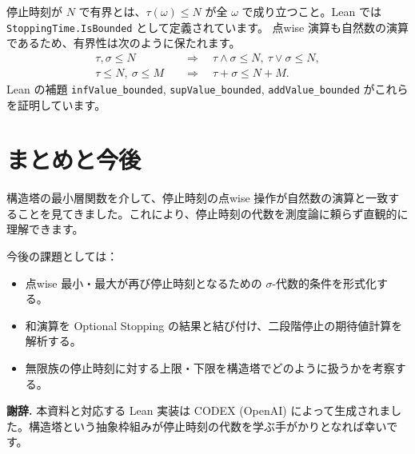 \documentclass[12pt]{ltjsarticle}
\theoremstyle{definition}
\theoremstyle{plain}
\begin{document}
停止時刻が $N$ で有界とは、$\tau(\omega)\le N$ が全 $\omega$ で成り立つこと。Lean では \texttt{StoppingTime.IsBounded} として定義されています。
点wise 演算も自然数の演算であるため、有界性は次のように保たれます。
\begin{align*}
  \tau,\sigma \le N \quad &\Longrightarrow\quad \tau\wedge\sigma \le N,\ \tau\vee\sigma \le N,\\
  \tau\le N,\ \sigma\le M \quad &\Longrightarrow\quad \tau+\sigma \le N+M.
\end{align*}
Lean の補題 \texttt{infValue\_bounded}, \texttt{supValue\_bounded}, \texttt{addValue\_bounded} がこれらを証明しています。

\section{まとめと今後}

構造塔の最小層関数を介して、停止時刻の点wise 操作が自然数の演算と一致することを見てきました。これにより、停止時刻の代数を測度論に頼らず直観的に理解できます。

今後の課題としては：
\begin{itemize}
  \item 点wise 最小・最大が再び停止時刻となるための $\sigma$-代数的条件を形式化する。
  \item 和演算を Optional Stopping の結果と結び付け、二段階停止の期待値計算を解析する。
  \item 無限族の停止時刻に対する上限・下限を構造塔でどのように扱うかを考察する。
\end{itemize}

\bigskip
\noindent\textbf{謝辞.}
本資料と対応する Lean 実装は CODEX (OpenAI) によって生成されました。構造塔という抽象枠組みが停止時刻の代数を学ぶ手がかりとなれば幸いです。
\end{document}
